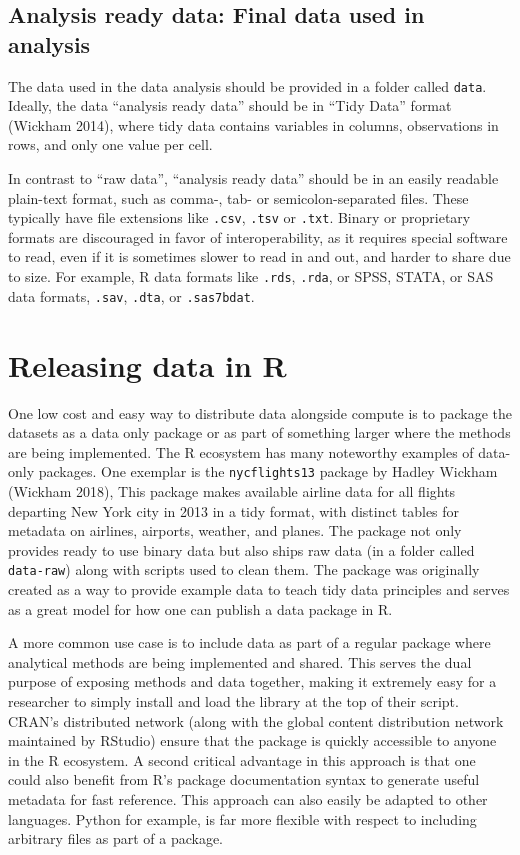 \documentclass[
]{article}
\begin{document}
\hypertarget{final-data}{%
\subsection{Analysis ready data: Final data used in analysis}\label{final-data}}

The data used in the data analysis should be provided in a folder called \texttt{data}. Ideally, the data ``analysis ready data'' should be in ``Tidy Data'' format (Wickham 2014), where tidy data contains variables in columns, observations in rows, and only one value per cell.

In contrast to ``raw data'', ``analysis ready data'' should be in an easily readable plain-text format, such as comma-, tab- or semicolon-separated files. These typically have file extensions like \texttt{.csv}, \texttt{.tsv} or \texttt{.txt}. Binary or proprietary formats are discouraged in favor of interoperability, as it requires special software to read, even if it is sometimes slower to read in and out, and harder to share due to size. For example, R data formats like \texttt{.rds}, \texttt{.rda}, or SPSS, STATA, or SAS data formats, \texttt{.sav}, \texttt{.dta}, or \texttt{.sas7bdat}.

\hypertarget{data-release-r}{%
\section{Releasing data in R}\label{data-release-r}}

One low cost and easy way to distribute data alongside compute is to package the datasets as a data only package or as part of something larger where the methods are being implemented. The R ecosystem has many noteworthy examples of data-only packages. One exemplar is the \texttt{nycflights13} package by Hadley Wickham (Wickham 2018), This package makes available airline data for all flights departing New York city in 2013 in a tidy format, with distinct tables for metadata on airlines, airports, weather, and planes. The package not only provides ready to use binary data but also ships raw data (in a folder called \texttt{data-raw}) along with scripts used to clean them. The package was originally created as a way to provide example data to teach tidy data principles and serves as a great model for how one can publish a data package in R.

A more common use case is to include data as part of a regular package where analytical methods are being implemented and shared. This serves the dual purpose of exposing methods and data together, making it extremely easy for a researcher to simply install and load the library at the top of their script. CRAN's distributed network (along with the global content distribution network maintained by RStudio) ensure that the package is quickly accessible to anyone in the R ecosystem. A second critical advantage in this approach is that one could also benefit from R's package documentation syntax to generate useful metadata for fast reference. This approach can also easily be adapted to other languages. Python for example, is far more flexible with respect to including arbitrary files as part of a package.
\end{document}
